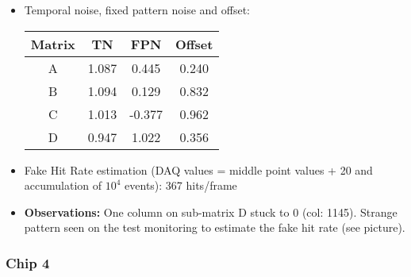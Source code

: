\documentclass[a4papper, 10pt]{article}
\begin{document}
\begin{itemize}
          \item Temporal noise, fixed pattern noise and offset:

            \begin{center}
              \begin{tabular}{|c|c|c|c|}
                \hline %
         \rowcolor{light-gray}         Matrix  &  TN   &  FPN  &  Offset  \tabularnewline
                \hline %
                    A     & 1.087 & 0.445 & 0.240    \tabularnewline
                \hline %
                    B     & 1.094 &  0.129 & 0.832   \tabularnewline
                \hline %
                    C     & 1.013 & -0.377 & 0.962   \tabularnewline
                \hline %
                    D     & 0.947 & 1.022 & 0.356    \tabularnewline
                \hline %
              \end{tabular}
            \end{center}

        \item Fake Hit Rate estimation (DAQ values = middle point values + 20 and accumulation of $10^4$ events): 367 hits/frame
        
        \item \textbf{Observations:} One column on sub-matrix D stuck to 0 (col: 1145). Strange pattern seen on the test monitoring to estimate the fake hit rate (see picture).
        
        \end{itemize}

      \subsubsection{Chip 4}
\end{document}
